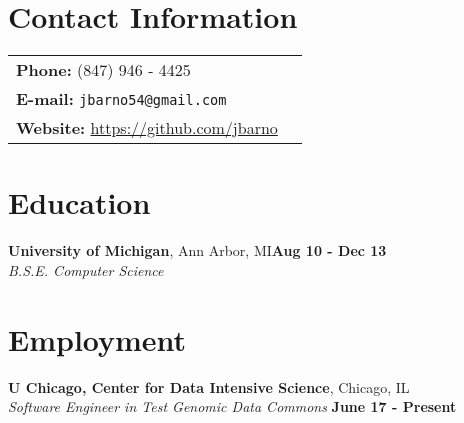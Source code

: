 \documentclass[margin,line]{res}
\begin{document}
\address{ 5467 S Ingleside Ave}
\address{ APT 3W, Chicago IL} 

\begin{resume}

\section{\sc Contact Information}
\begin{tabular}{@{}p{3in}p{4in}}
{\bf Phone:}   (847) 946 - 4425\\
{\bf E-mail:}  {\tt jbarno54@gmail.com} \\
{\bf Website:} \url{https://github.com/jbarno} \\
\end{tabular}


\section{\sc Education}
  {\bf University of Michigan}, Ann Arbor, MI\hfill {\bf Aug 10  - Dec 13}\\
  {\em B.S.E. Computer Science}


\section{\sc Employment}
  {\bf U Chicago, Center for Data Intensive Science}, Chicago, IL\\
  {\em Software Engineer in Test Genomic Data Commons} \hfill {\bf  June 17 - Present}\\


\end{resume}
\end{document}
